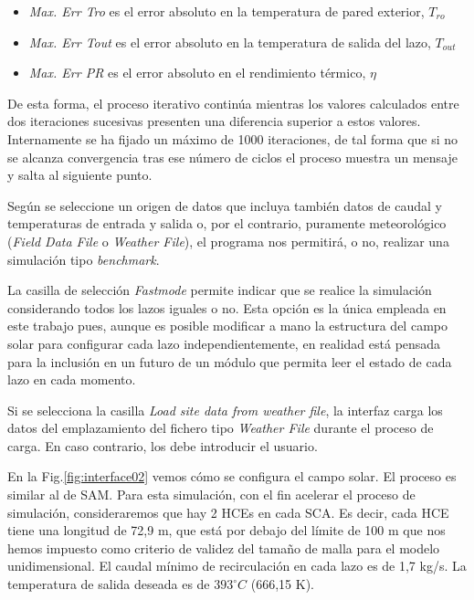 \begin{itemize}
\item
\emph{Max. Err Tro} es el error absoluto en la temperatura de pared exterior, $T_{ro}$
\item
\emph{Max. Err Tout} es el error absoluto en la temperatura de salida del lazo, $T_{out}$
\item
\emph{Max. Err PR} es el error absoluto en el rendimiento térmico, $\eta$
\end{itemize}

De esta forma, el proceso iterativo continúa mientras los valores calculados entre dos iteraciones sucesivas presenten una diferencia superior a estos valores. Internamente se ha fijado un máximo de 1000 iteraciones, de tal forma que si no se alcanza convergencia tras ese número de ciclos el proceso muestra un mensaje y salta al siguiente punto.

Según se seleccione un origen de datos que incluya también datos de caudal y temperaturas de entrada y salida o, por el contrario, puramente meteorológico (\emph{Field Data File} o \emph{Weather File}), el programa nos permitirá, o no, realizar una simulación tipo \emph{benchmark}. 

La casilla de selección \emph{Fastmode} permite indicar que se realice la simulación considerando todos los lazos iguales o no. Esta opción es la única empleada en este trabajo pues, aunque es posible modificar a mano la estructura del campo solar para configurar cada lazo independientemente, en realidad está pensada para la inclusión en un futuro de un módulo que permita leer el estado de cada lazo en cada momento.

Si se selecciona la casilla \emph{Load site data from weather file}, la interfaz carga los datos del emplazamiento del fichero tipo \emph{Weather File} durante el proceso de carga. En caso contrario, los debe introducir el usuario.

En la Fig.\ref{fig:interface02} vemos cómo se configura el campo solar. El proceso es similar al de SAM. Para esta simulación, con el fin acelerar el proceso de simulación, consideraremos que hay 2 HCEs en cada SCA. Es decir, cada HCE tiene una longitud de 72,9 m, que está por debajo del límite de 100 m que nos hemos impuesto como criterio de validez del tamaño de malla para el modelo unidimensional.  El caudal mínimo de recirculación en cada lazo es de 1,7 kg/s. La temperatura de salida deseada es de $393 ^\circ C$ (666,15 K).

